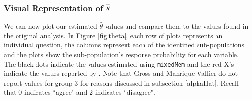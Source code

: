 \documentclass{article}\usepackage[]{graphicx}\usepackage[]{color}
\begin{document}
\subsubsection{Visual Representation of $\hat \theta$}

We can now plot our estimated $\hat \theta$ values and compare them to the values found in the original analysis. In Figure \ref{fig:theta}, each row of plots represents an individual question, the columns represent each of the identified sub-populations and the plots show the sub-population's response probability for each variable. The black dots indicate the values estimated using \texttt{mixedMem} and the red X's indicate the values reported by \citep{grossManriqueVallier}. Note that Gross and Manrique-Vallier do not report values for group 3 for reasons discussed in subsection \ref{alphaHat}. Recall that 0 indicates ``agree" and 2 indicates ``disagree".
\end{document}
